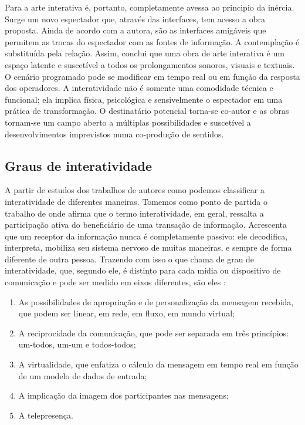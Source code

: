 Para  a arte interativa é, portanto, completamente avessa ao principio da inércia. Surge um novo espectador que, através das interfaces, tem acesso a obra proposta. Ainda de acordo com a autora, são as interfaces amigáveis que permitem as trocas do espectador com as fontes de informação. A contemplação é substituída pela relação. Assim,  conclui que uma obra de arte interativa é um espaço latente e suscetível a todos os prolongamentos sonoros, visuais e textuais. O cenário programado pode se modificar em tempo real ou em função da resposta dos operadores. A interatividade não é somente uma comodidade técnica e funcional; ela implica física, psicológica e sensivelmente o espectador em uma prática de transformação. O destinatário potencial torna-se co-autor e as obras tornam-se um campo aberto a múltiplas possibilidades e suscetível a desenvolvimentos imprevistos numa co-produção de sentidos.


\subsection{Graus de interatividade}

A partir de estudos dos trabalhos de autores como  podemos classificar a interatividade de diferentes maneiras. Tomemos como ponto de partida o trabalho de  onde afirma que o termo interatividade, em geral, ressalta a participação ativa do beneficiário de uma transação de informação. Acrescenta que um receptor da informação nunca é completamente passivo: ele decodifica, interpreta, mobiliza seu sistema nervoso de muitas maneiras, e sempre de forma diferente de outra pessoa. Trazendo com isso o que chama de grau de interatividade, que, segundo ele, é distinto para cada mídia ou dispositivo de comunicação e pode ser medido em eixos diferentes, são eles  \cite[p. 82]{levy}:

\begin{enumerate}
  \item As possibilidades de apropriação e de personalização da mensagem recebida, que podem ser linear, em rede, em fluxo, em mundo virtual;
  \item A reciprocidade da comunicação, que pode ser separada em três princípios: um-todos, um-um e todos-todos;
  \item A virtualidade, que enfatiza o cálculo da mensagem em tempo real em função de um modelo de dados de entrada;
  \item A implicação da imagem dos participantes nas mensagens;
  \item A telepresença. 
\end{enumerate}

